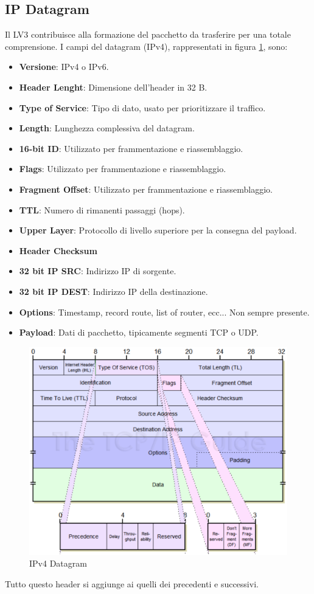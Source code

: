 \documentclass[12pt]{article}
\begin{document}
\subsection{IP Datagram}
Il LV3 contribuisce alla formazione del pacchetto da trasferire per una totale comprensione. I campi del datagram (IPv4), rappresentati in figura \ref{fig:ipdata}, sono:
\begin{itemize}
  \item \textbf{Versione}: IPv4 o IPv6.
  \item \textbf{Header Lenght}: Dimensione dell'header in 32 B.
  \item \textbf{Type of Service}: Tipo di dato, usato per prioritizzare il traffico.
  \item \textbf{Length}: Lunghezza complessiva del datagram.
  \item \textbf{16-bit ID}: Utilizzato per frammentazione e riassemblaggio.
  \item \textbf{Flags}: Utilizzato per frammentazione e riassemblaggio.
  \item \textbf{Fragment Offset}: Utilizzato per frammentazione e riassemblaggio.
  \item \textbf{TTL}: Numero di rimanenti passaggi (hops).
  \item \textbf{Upper Layer}: Protocollo di livello superiore per la consegna del payload.
  \item \textbf{Header Checksum}
  \item \textbf{32 bit IP SRC}: Indirizzo IP di sorgente.
  \item \textbf{32 bit IP DEST}: Indirizzo IP della destinazione.
  \item \textbf{Options}: Timestamp, record route, list of router, ecc... Non sempre presente.
  \item \textbf{Payload}: Dati di pacchetto, tipicamente segmenti TCP o UDP.
\end{itemize}

\begin{figure}[!hp]
  \includegraphics[width=\textwidth]{images/ipheader.png}
  \caption{IPv4 Datagram}
  \label{fig:ipdata}
\end{figure}

Tutto questo header si aggiunge ai quelli dei precedenti e successivi. %



\end{document}

